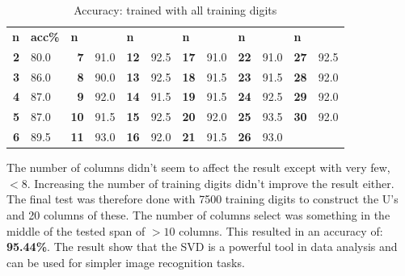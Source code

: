 \documentclass[a4paper]{article}
\begin{document}
\begin{table}[ht]
\begin{tabular}{rlrlrlrlrlrl}
\multicolumn{1}{l}{\textbf{n}} & \textbf{acc\%} & \multicolumn{1}{l}{\textbf{n}} & \textbf{} & \multicolumn{1}{l}{\textbf{n}} & \textbf{} & \multicolumn{1}{l}{\textbf{n}} & \textbf{} & \multicolumn{1}{l}{\textbf{n}} & \textbf{} & \multicolumn{1}{l}{\textbf{n}} & \textbf{} \\
\textbf{2}                     & 80.0           & \textbf{7}                     & 91.0      & \textbf{12}                    & 92.5      & \textbf{17}                    & 91.0      & \textbf{22}                    & 91.0      & \textbf{27}                    & 92.5      \\
\textbf{3}                     & 86.0           & \textbf{8}                     & 90.0      & \textbf{13}                    & 92.5      & \textbf{18}                    & 91.5      & \textbf{23}                    & 91.5      & \textbf{28}                    & 92.0      \\
\textbf{4}                     & 87.0           & \textbf{9}                     & 92.0      & \textbf{14}                    & 91.5      & \textbf{19}                    & 91.5      & \textbf{24}                    & 92.5      & \textbf{29}                    & 92.0      \\
\textbf{5}                     & 87.0           & \textbf{10}                    & 91.5      & \textbf{15}                    & 92.5      & \textbf{20}                    & 92.0      & \textbf{25}                    & 93.5      & \textbf{30}                    & 92.0      \\
\textbf{6}                     & 89.5           & \textbf{11}                    & 93.0      & \textbf{16}                    & 92.0      & \textbf{21}                    & 91.5      & \textbf{26}                    & 93.0      & \multicolumn{1}{l}{}           &          
\end{tabular}
\caption{Accuracy: trained with all training digits}
\end{table}

The number of columns didn't seem to affect the result except with very few, $<8$. Increasing the number of training digits didn't improve the result either. The final test was therefore done with 7500 training digits to construct the U's and  20 columns of these. The number of columns select was  something in the middle of the tested span of $>10$ columns. This resulted in an accuracy of: \textbf{95.44\%}. The result show that the SVD is a powerful tool in data analysis and can be used for simpler image recognition tasks.  



\end{document}
